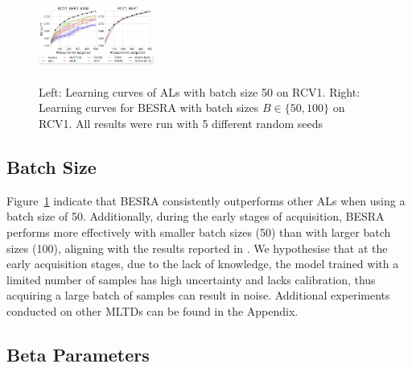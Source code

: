 \documentclass[letterpaper]{article} %
\begin{document}
\begin{figure}[!ht]
\centering
\includegraphics[width=0.33840000000000003\textwidth,height=1.18in ]{figures/batchsize_mircof1_2_v1.png}
\caption{
Left: Learning curves of ALs with batch size 50 on RCV1. Right: Learning curves for BESRA with batch sizes $B \in  \{50, 100\}$ on RCV1. All results were run with 5 different random seeds}
\label{fig:batchsize_mircof1_2}
\end{figure}

\vspace{-3.16mm}
\subsection{Batch Size}
Figure~\ref{fig:batchsize_mircof1_2} indicate that BESRA consistently outperforms other ALs when using a batch size of 50.
Additionally, during the early stages of acquisition, BESRA performs more effectively with smaller batch sizes (50) than with larger batch sizes (100), aligning with the results reported in \cite{TanDuBun-IEEEPAMI23, NEURIPS2019_95323660}.
We hypothesise that at the early acquisition stages, due to the lack of knowledge, the model trained with a limited number of samples has high uncertainty and lacks calibration, thus acquiring a large batch of samples can result in noise. Additional experiments conducted on other MLTDs can be found in the Appendix.


\vspace{-3.05mm}
\subsection{Beta Parameters}
\end{document}
